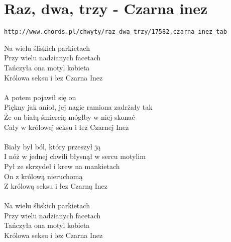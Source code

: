\section{Raz, dwa, trzy - Czarna inez}
\begin{verbatim}
http://www.chords.pl/chwyty/raz_dwa_trzy/17582,czarna_inez_tab
\end{verbatim}
Na wielu śliskich parkietach \\
Przy wielu nadzianych facetach \\
Tańczyła ona motyl kobieta \\
Królowa seksu i łez Czarna Inez \\
\\
A potem pojawił się on \\
Piękny jak anioł, jej nagie ramiona zadrżały tak \\
Że on białą śmiercią mógłby w niej skonać \\
Cały w królowej seksu i łez Czarnej Inez \\
\\
Biały był ból, który przeszył ją \\
I nóż w jednej chwili błysnął w sercu motylim \\
Pył ze skrzydeł i krew na mankietach \\
On z królową nieruchomą \\
Z królową seksu i łez Czarną Inez \\
\\
Na wielu śliskich parkietach \\
Przy wielu nadzianych facetach \\
Tańczyła ona motyl kobieta \\
Królowa seksu i łez Czarna Inez\\
\newpage


